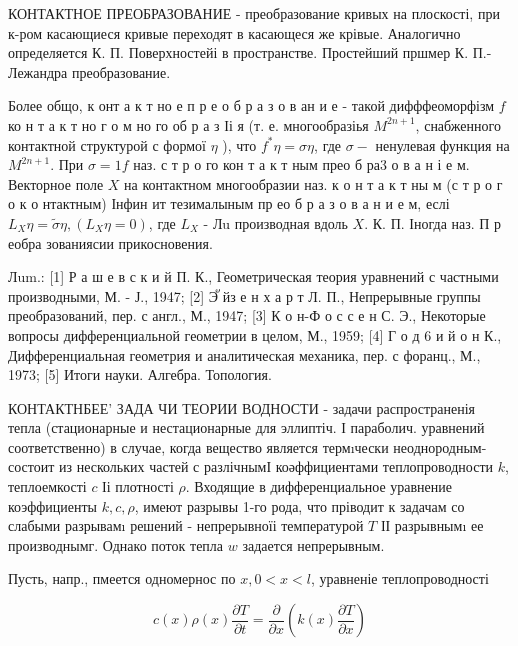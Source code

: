 \documentclass[10pt]{article}
\begin{document}
КОНТАКТНОЕ ПРЕОБРАЗОВАНИЕ - преобразование кривых на плоскості, при к-ром касающиеся кривые переходят в касающеся же крівые. Аналогично определяется К. П. Поверхностейі в пространстве. Простейший пршмер К. П.- Лежандра преобразование.



Более общо, к онт а к т но е п р е о б р а з о в ан и е - такой дифффеоморфізм $f$ ко н т а к т но г о м но го об р а з Іі я (т. е. многообразіья $M^{2 n+1}$, снабженного контактной структурой с формої $\eta$ ), что $f^{*} \eta=\sigma \eta$, где $\sigma-$ ненулевая функция на $M^{2 n+1}$. При $\sigma=1 f$ наз. с т р о го кон т а к т ным прео б ра3 о в а н і е м. Векторное поле $X$ на контактном многообразии наз. к о н т а к т ны м (с т р о г о к о нтактным) Інфин ит тезималыным пр ео б р а з о в а н и е м, еслі $L_{X} \eta=\tilde{\sigma} \eta,\left(L_{X} \eta=0\right)$, где $L_{X}$ - Лu производная вдоль $X$. К. П. Іногда наз. П р еобра зованиясии прикосновения.



Лum.: [1] Р а ш е в с к и й П. К., Геометрическая теория уравнений с частными производными, М. - Ј., 1947; [2] Эั йз е н х а р т Л. П., Непрерывные группы преобразований, пер. с англ., М., 1947; [3] К о н-Ф о с с е н С. Э., Некоторые вопросы дифференциальной геометрии в целом, М., 1959; [4] Г о д 6 и й о н К., Дифференциальная геометрия и аналитическая механика, пер. с форанц., М., 1973; [5] Итоги науки. Алгебра. Топология.



КОНТАКТНБЕЕ' ЗАДА ЧИ ТЕОРИИ ВОДНОСТИ - задачи распространенія тепла (стационарные и нестационарные для эллиптіч. І параболич. уравнений соответственно) в случае, когда вещество является термıчески неоднородным- состоит из нескольких частей с разлічнымІ коәффициентами теплопроводности $k$, теплоемкості $c$ Іі плотності $\rho$. Входящие в дифференциальное уравнение коэффициенты $k, c, \rho$, имеют разрывы 1-го рода, что пріводит к задачам со слабыми разрывамı решений - непрерывноїі температурой $T$ ІІ разрывнымı ее производнымг. Однако поток тепла $w$ задается непрерывным.



Пусть, напр., пмеется одномернос по $x, 0<x<l$, уравненіе теплопроводності



\[

c(x) \rho(x) \frac{\partial T}{\partial t}=\frac{\partial}{\partial x}\left(k(x) \frac{\partial T}{\partial x}\right)

\]
\end{document}
